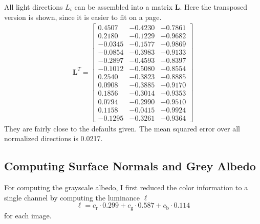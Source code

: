 \documentclass{paper}
\begin{document}
All light directions $L_i$ can be assembled into a matrix $\mathbf{L}$. Here the
transposed version is shown, since it is easier to fit on a page.
\begin{align*}
\mathbf{L}^T= 
\left[ 
\begin{array}{cccccccccccccc}
0.4507 & -0.4230 & -0.7861 \\ 0.2180 & -0.1229 & -0.9682 \\ -0.0345 & -0.1577 & -0.9869 \\ -0.0854 & -0.3983 & -0.9133 \\ -0.2897 & -0.4593 & -0.8397 \\ -0.1012 & -0.5080 & -0.8554 \\ 0.2540 & -0.3823 & -0.8885 \\ 0.0908 & -0.3885 & -0.9170 \\ 0.1856 & -0.3014 & -0.9353 \\ 0.0794 & -0.2990 & -0.9510 \\ 0.1158 & -0.0415 & -0.9924 \\ -0.1295 & -0.3261 & -0.9364 
\end{array} 
\right] 
\end{align*}
They are fairly close to the defaults given. The mean squared error over all normalized directions is 0.0217.

\subsection{Computing Surface Normals and Grey Albedo}


For computing the grayscale albedo, I first reduced the color information to a single channel by computing the luminance $\ell$
\begin{equation}
	\ell = c_\text{r} \cdot 0.299 + 
		c_\text{g} \cdot 0.587 + 
		c_\text{b} \cdot 0.114
\end{equation}
for each image. 
\end{document}
